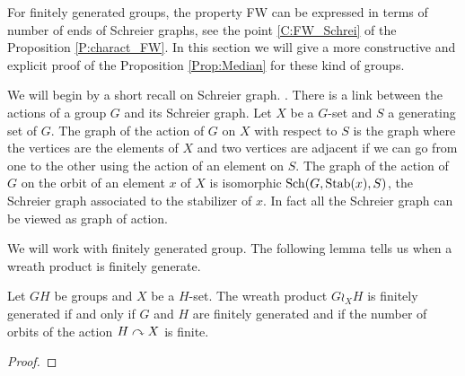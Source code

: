 For finitely generated groups, the property FW can be expressed in terms of number of ends of Schreier graphs, see the point \ref{C:FW_Schrei} of the Proposition \ref{P:charact_FW}. In this section we will give a more constructive and explicit proof of the Proposition \ref{Prop:Median} for these kind of groups. 

We will begin by a short recall on Schreier graph. . There is a link between the actions of a group $G$ and its Schreier graph. Let $X$ be a $G$-set and $S$ a generating set of $G$. The graph of the action of $G$ on $X$ with respect to $S$ is the graph where the vertices are the elements of $X$ and two vertices are adjacent if we can go from one to the other using the action of an element on $S$. The graph of the action of $G$ on the orbit of an element $x$ of $X$ is isomorphic $\operatorname{Sch}(G,\operatorname{Stab}(x),S)$, the Schreier graph associated to the stabilizer of $x$. In fact all the Schreier graph can be viewed as graph of action.

We will work with finitely generated group. The following lemma tells us when a wreath product is finitely generate.
\begin{lem}
Let $GH$ be groups and $X$ be a $H$-set. The wreath product $G \wr_X H$ is finitely generated if and only if $G$ and $H$ are finitely generated and if the number of orbits of the action $H \curvearrowright X$ is finite.
\end{lem}
\begin{proof}
\end{proof}

